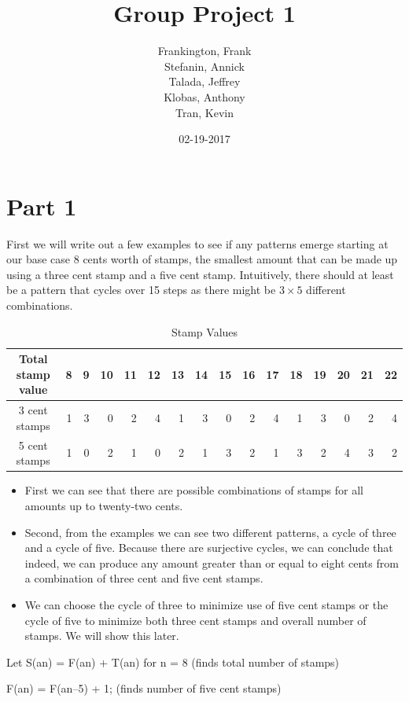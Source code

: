 \documentclass{article}
\title{Group Project 1}
\date{02-19-2017}
\author{Frankington, Frank\\Stefanin, Annick\\Talada, Jeffrey\\Klobas, Anthony\\ Tran, Kevin\\  }
\begin{document}
\maketitle
\newpage
{}

\section{Part 1}
First we will write out a few examples to see if any patterns emerge starting at our base case 8 cents worth of stamps, the smallest amount that can be made up using a three cent stamp and a five cent stamp. Intuitively, there should at least be a pattern that cycles over 15 steps as there might be $3×5$ different combinations.

\begin{table}[h]
	\caption{Stamp Values}
	\centering
	\begin{tabular}{c rrrrrrrrrrrrrrr}
		\hline\hline
		Total stamp value & 8 & 9 & 10 & 11 & 12 & 13 & 14 & 15 & 16 & 17 & 18 & 19 & 20 & 21 & 22 \\[0.5ex]
	\hline
	3 cent stamps & 1 & 3 & 0 & 2 & 4 & 1 & 3 & 0 & 2 & 4 & 1 & 3 & 0 & 2 & 4\\
	5 cent stamps & 1 & 0 & 2 & 1 & 0 & 2 & 1 & 3 & 2 & 1 & 3 & 2 & 4 & 3 & 2\\ [1ex] %
	\hline
\end{tabular}
\label{tab:hresult}
\end{table}

\begin{itemize}
	\item First we can see that there are possible combinations of stamps for all amounts up to twenty-two cents.
	\item Second, from the examples we can see two different patterns, a cycle of three and a cycle of five. Because there are surjective cycles, we can conclude that indeed, we can produce any amount greater than or equal to eight cents from a combination of three cent and five cent stamps.
	\item We can choose the cycle of three to minimize use of five cent stamps or the cycle of five to minimize both three cent stamps and overall number of stamps. We will show this later.
\end{itemize}

\noindent Let S(an) = F(an) + T(an) for n = 8  (finds total number of stamps)

\noindent F(an) = F(an–5) + 1; (finds number of five cent stamps)
\end{document}

